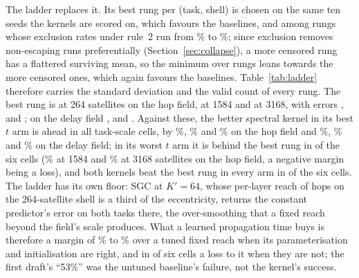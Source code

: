\documentclass[preprint,11pt,3p]{elsarticle}
\begin{document}
The ladder replaces it. Its best rung per (task, shell) is chosen on the same ten seeds the
kernels are scored on, which favours the baselines, and among rungs whose exclusion rates under
rule~2 run from \numLadderExclMinPct\% to \numLadderExclMaxPct\%; since exclusion removes
non-escaping runs preferentially (Section~\ref{sec:collapse}), a more censored rung has a
flattered surviving mean, so the minimum over rungs leans towards the more censored ones, which
again favours the baselines. Table~\ref{tab:ladder} therefore carries the standard deviation and
the valid count of every rung. The best rung is \numLadderBestNameHopsSmall{} at 264
satellites on the hop field, \numLadderBestNameHopsShellOne{} at 1584 and
\numLadderBestNameHopsDouble{} at 3168, with errors \numLadderBestHopsSmall{},
\numLadderBestHopsShellOne{} and \numLadderBestHopsDouble{}; on the delay field
\numLadderBestNameDelaySmall{}, \numLadderBestNameDelayShellOne{} and
\numLadderBestNameDelayDouble{}. Against these, the better spectral kernel in its best $t$ arm
is ahead in all \numSpecBestBeatsLadderCells{} task-scale cells, by \numLadderGapBestPctHopsSmall\%,
\numLadderGapBestPctHopsShellOne\% and \numLadderGapBestPctHopsDouble\% on the hop field and
\numLadderGapBestPctDelaySmall\%, \numLadderGapBestPctDelayShellOne\% and
\numLadderGapBestPctDelayDouble\% on the delay field; in its worst $t$ arm it is behind the best
rung in \numLadderWorstBehindCells{} of the six cells (\numLadderGapWorstPctHopsShellOne\% at 1584
and \numLadderGapWorstPctHopsDouble\% at 3168 satellites on the hop field, a negative margin being
a loss), and both kernels beat the best rung in every arm in \numBothBeatLadderCells{} of the six
cells. The ladder has its own floor: SGC at $K'=64$, whose per-layer reach of
\numReachSgcSixtyFourSmall{} hops on the 264-satellite shell is a third of the eccentricity,
returns the constant predictor's error on both tasks there, the over-smoothing that a fixed reach
beyond the field's scale produces. What a learned propagation time buys is therefore a margin of
\numLadderGapBestMin\% to \numLadderGapBestMax\% over a tuned fixed reach when its
parameterisation and initialisation are right, and in \numLadderWorstBehindCells{} of six cells a
loss to it when they are not; the first draft's ``53\%'' was the untuned baseline's
failure, not the kernel's success.

\begin{table}[htbp]
\centering
\caption{The first-draft fixed-reach baselines of~\eqref{eq:fixed}: the constant predictor's
MAE and the MAE of personalised-PageRank propagation ($\alpha=\numPprAlpha$, $K=\numPprK$ steps)
and of the $K'=\numSgcK$ power of the normalised adjacency, mean $\pm$ sd over valid seeds (at
200 epochs all ten seeds are valid; at 1000 epochs the count is in parentheses), submitted
capacity, beside the lower of the two spectral kernels' means at 1000 epochs.}
\label{tab:fixed}

\end{table}
\end{document}
